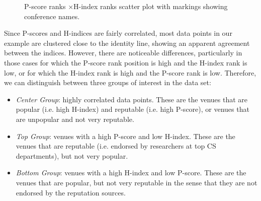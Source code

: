 \documentclass[notitlepage]{svjour3}
\begin{document}
\begin{figure}[ht!]
  \begin{center}
    \caption{P-score ranks $ \times $H-index ranks scatter plot with markings showing conference names.}
    \label{fig:markings}
  \end{center}
\end{figure}

Since P-scores and H-indices are fairly correlated, most data points in our example are clustered close to the identity 
line, showing an apparent agreement between the indices. However, there are noticeable differences, 
particularly in those cases for which the P-score rank position is high and the H-index rank is low,
or for which the H-index rank is high and the 
P-score rank is low. Therefore, we 
can distinguish between three groups of interest in the data set:
%
\begin{itemize}
\item \textit{Center Group}: highly correlated data points. These are the 
venues that are popular (i.e. high H-index) and reputable (i.e. high P-score), 
or venues that are unpopular and not very reputable.
\item \textit{Top Group}: venues with a high P-score and low H-index. These 
are the venues that are reputable (i.e. endorsed by researchers at top CS departments), 
but not very popular.
\item \textit{Bottom Group}: venues with a high H-index and low P-score. 
These are the venues that are popular, but not very reputable in the sense 
that they are not endorsed by the reputation sources.
\end{itemize}
%
\end{document}
